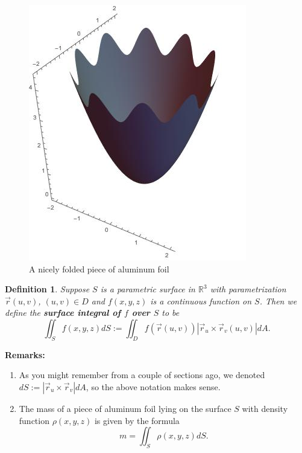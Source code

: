 \documentclass[12pt]{article}
\newcommand{\R}{ \mathbb{R}}
\newcommand{\vr}{\vec{r}{}}
\newcommand{\rcross}{\vr_u\times\vr_v}
\newtheorem{defn}{Definition}
\begin{document}
\begin{figure}[h]
\begin{center}
\includegraphics[scale=.3]{foil.jpeg}
\caption{A nicely folded piece of aluminum foil}
\end{center}
\end{figure}

\begin{defn}
Suppose $S$ is a parametric surface in $\R^3$ with parametrization $\vr(u,v)$, $(u,v)\in D$ and $f(x,y,z)$ is a continuous function on $S$. Then we define the \textbf{surface integral of $f$ over $S$} to be $$\iint_S f(x,y,z)dS:=\iint_D f(\vr(u,v))|\rcross(u,v)| dA.$$
\end{defn}

\textbf{Remarks:}
\begin{enumerate}
\item As you might remember from a couple of sections ago, we denoted $dS:=|\rcross|dA$, so the above notation makes sense.
\item The mass of a piece of aluminum foil lying on the surface $S$ with density function $\rho(x,y,z)$ is given by the formula $$m=\iint_S \rho(x,y,z)dS.$$ 
\end{enumerate}
\end{document}
